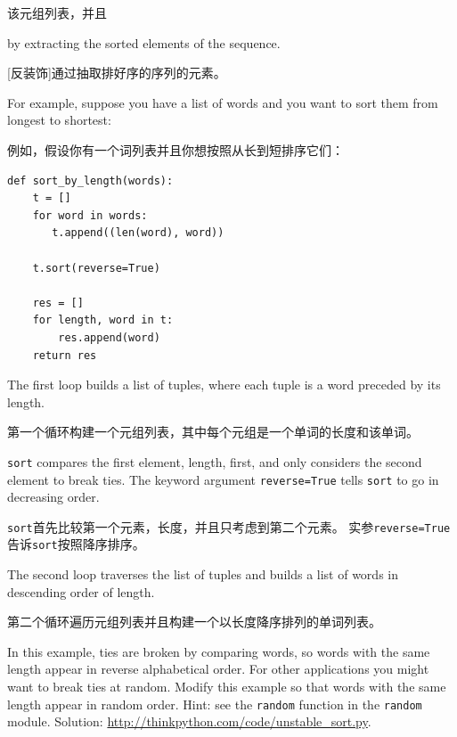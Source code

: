 \documentclass[10pt]{book}
\begin{document}
\begin{CJK}{UTF8}{gbsn}
\begin{description}
[排序]该元组列表，并且

\item[Undecorate] by extracting the sorted elements of the sequence.

[反装饰]通过抽取排好序的序列的元素。

\end{description}

\label{DSU}

For example, suppose you have a list of words and you want to
sort them from longest to shortest:

例如，假设你有一个词列表并且你想按照从长到短排序它们：

\begin{verbatim}
def sort_by_length(words):
    t = []
    for word in words:
       t.append((len(word), word))

    t.sort(reverse=True)

    res = []
    for length, word in t:
        res.append(word)
    return res
\end{verbatim}
%
The first loop builds a list of tuples, where each
tuple is a word preceded by its length.

第一个循环构建一个元组列表，其中每个元组是一个单词的长度和该单词。

{\tt sort} compares the first element, length, first, and
only considers the second element to break ties.  The keyword argument
{\tt reverse=True} tells {\tt sort} to go in decreasing order.

{\tt sort}首先比较第一个元素，长度，并且只考虑到第二个元素。
实参{\tt reverse=True}告诉{\tt sort}按照降序排序。

The second loop traverses the list of tuples and builds a list of
words in descending order of length.

第二个循环遍历元组列表并且构建一个以长度降序排列的单词列表。

\begin{exercise}

In this example, ties are broken by comparing words, so words
with the same length appear in reverse alphabetical order.  For other
applications you might want to break ties at random.  Modify
this example so that words with the same length appear in
random order.  Hint: see the {\tt random} function in the
{\tt random} module.
Solution: \url{http://thinkpython.com/code/unstable_sort.py}.


\end{exercise}
\end{CJK}
\end{document}
